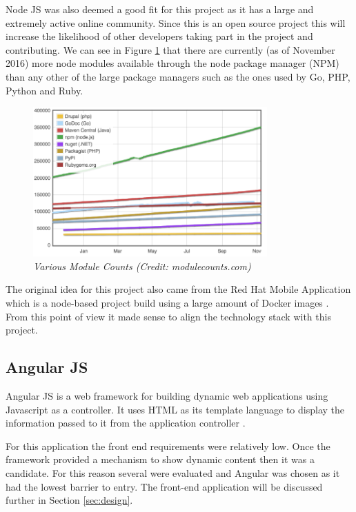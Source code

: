Node JS was also deemed a good fit for this project as it has a large and extremely active online community. Since this is an open source project this will increase the likelihood of other developers taking part in the project and contributing. We can see in Figure \ref{fig:counts} that there are currently (as of November 2016) more node modules available through the node package manager (NPM) than any other of the large package managers such as the ones used by Go, PHP, Python and Ruby. 
\newpage
\begin{figure}[!ht]
\centering
\includegraphics*[width=0.8\textwidth]{images/module_counts}
\caption{\em Various Module Counts (Credit: modulecounts.com)}
\label{fig:counts}
\end{figure}

The original idea for this project also came from the Red Hat Mobile Application which is a node-based project build using a large amount of Docker images \citep{RedHat2016}. From this point of view it made sense to align the technology stack with this project.

\subsection{Angular JS}
Angular JS is a web framework for building dynamic web applications using Javascript as a controller. It uses HTML as its template language to display the information passed to it from the application controller \citep{Angular2017}. 

For this application the front end requirements were relatively low. Once the framework provided a mechanism to show dynamic content then it was a candidate. For this reason several were evaluated and Angular was chosen as it had the lowest barrier to entry. The front-end application will be discussed further in Section \ref{sec:design}.

